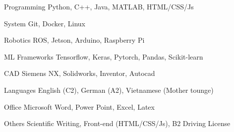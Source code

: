 

\begin{cvskills}

  \cvskill
    {Programming} %
    {Python, C++, Java, MATLAB, HTML/CSS/Js} %

  \cvskill
    {System} %
    {Git, Docker, Linux} %
        
  \cvskill
    {Robotics} %
    {ROS, Jetson, Arduino, Raspberry Pi} %
 
  \cvskill
    {ML Frameworks} %
    {Tensorflow, Keras, Pytorch, Pandas, Scikit-learn} %
    
  \cvskill
    {CAD} %
    {Siemens NX, Solidworks, Inventor, Autocad} %
    
  \cvskill
    {Languages} %
    {English (C2), German (A2), Vietnamese (Mother tounge)} %
    
  \cvskill
    {Office} %
    {Microsoft Word, Power Point, Excel, Latex} %

  \cvskill
    {Others} %
    {Scientific Writing, Front-end (HTML/CSS/Js), B2 Driving License} %

\end{cvskills}

